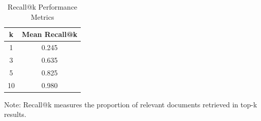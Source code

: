 \begin{table}[htbp]
\centering
\caption{Recall@k Performance Metrics}
\label{tab:recall_at_k}
\begin{tabular}{cc}
\toprule
k & Mean Recall@k \\
\midrule
1 & 0.245 \\
3 & 0.635 \\
5 & 0.825 \\
10 & 0.980 \\
\bottomrule
\end{tabular}
\begin{tablenotes}
\small
\item Note: Recall@k measures the proportion of relevant documents retrieved in top-k results.
\end{tablenotes}
\end{table}
